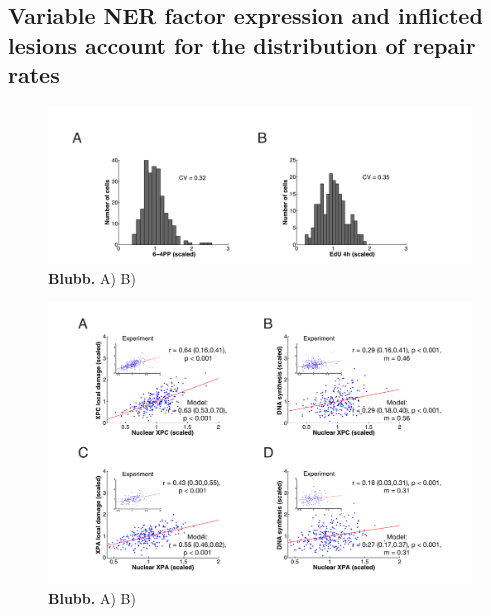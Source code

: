 \subsection{Variable NER factor expression and inflicted lesions account for the distribution of repair rates} 
\begin{figure}[htbp]
	\begin{center}
		\includegraphics[width=1\textwidth]{Abbildungen/figure3_5.pdf}
		\caption{\textbf{Blubb.} A) B) }
		\label{fig:DamageDist}
	\end{center}
\end{figure}

\begin{figure}[htbp]
	\begin{center}
		\includegraphics[width=1\textwidth]{Abbildungen/figure3_6.pdf}
		\caption{\textbf{Blubb.} A) B) }
		\label{fig:Model_dataComp}
	\end{center}
\end{figure}

